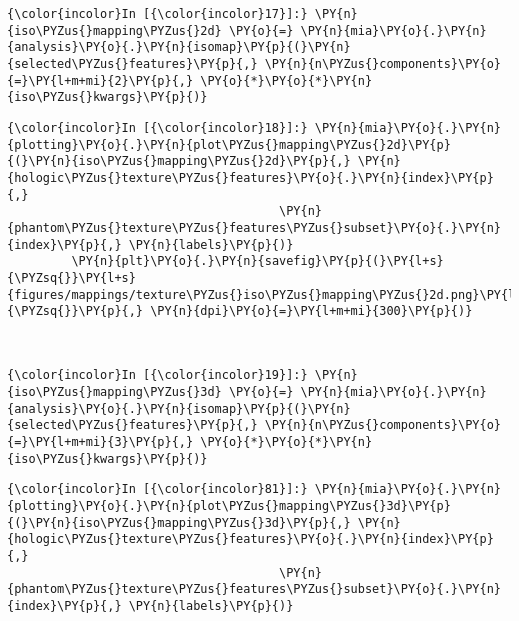     \begin{Verbatim}[commandchars=\\\{\}]
{\color{incolor}In [{\color{incolor}17}]:} \PY{n}{iso\PYZus{}mapping\PYZus{}2d} \PY{o}{=} \PY{n}{mia}\PY{o}{.}\PY{n}{analysis}\PY{o}{.}\PY{n}{isomap}\PY{p}{(}\PY{n}{selected\PYZus{}features}\PY{p}{,} \PY{n}{n\PYZus{}components}\PY{o}{=}\PY{l+m+mi}{2}\PY{p}{,} \PY{o}{*}\PY{o}{*}\PY{n}{iso\PYZus{}kwargs}\PY{p}{)}
\end{Verbatim}

    \begin{Verbatim}[commandchars=\\\{\}]
{\color{incolor}In [{\color{incolor}18}]:} \PY{n}{mia}\PY{o}{.}\PY{n}{plotting}\PY{o}{.}\PY{n}{plot\PYZus{}mapping\PYZus{}2d}\PY{p}{(}\PY{n}{iso\PYZus{}mapping\PYZus{}2d}\PY{p}{,} \PY{n}{hologic\PYZus{}texture\PYZus{}features}\PY{o}{.}\PY{n}{index}\PY{p}{,}
                                      \PY{n}{phantom\PYZus{}texture\PYZus{}features\PYZus{}subset}\PY{o}{.}\PY{n}{index}\PY{p}{,} \PY{n}{labels}\PY{p}{)}
         \PY{n}{plt}\PY{o}{.}\PY{n}{savefig}\PY{p}{(}\PY{l+s}{\PYZsq{}}\PY{l+s}{figures/mappings/texture\PYZus{}iso\PYZus{}mapping\PYZus{}2d.png}\PY{l+s}{\PYZsq{}}\PY{p}{,} \PY{n}{dpi}\PY{o}{=}\PY{l+m+mi}{300}\PY{p}{)}
\end{Verbatim}

    \begin{center}
    \end{center}
    { \hspace*{\fill} \\}

    \begin{Verbatim}[commandchars=\\\{\}]
{\color{incolor}In [{\color{incolor}19}]:} \PY{n}{iso\PYZus{}mapping\PYZus{}3d} \PY{o}{=} \PY{n}{mia}\PY{o}{.}\PY{n}{analysis}\PY{o}{.}\PY{n}{isomap}\PY{p}{(}\PY{n}{selected\PYZus{}features}\PY{p}{,} \PY{n}{n\PYZus{}components}\PY{o}{=}\PY{l+m+mi}{3}\PY{p}{,} \PY{o}{*}\PY{o}{*}\PY{n}{iso\PYZus{}kwargs}\PY{p}{)}
\end{Verbatim}

    \begin{Verbatim}[commandchars=\\\{\}]
{\color{incolor}In [{\color{incolor}81}]:} \PY{n}{mia}\PY{o}{.}\PY{n}{plotting}\PY{o}{.}\PY{n}{plot\PYZus{}mapping\PYZus{}3d}\PY{p}{(}\PY{n}{iso\PYZus{}mapping\PYZus{}3d}\PY{p}{,} \PY{n}{hologic\PYZus{}texture\PYZus{}features}\PY{o}{.}\PY{n}{index}\PY{p}{,}
                                      \PY{n}{phantom\PYZus{}texture\PYZus{}features\PYZus{}subset}\PY{o}{.}\PY{n}{index}\PY{p}{,} \PY{n}{labels}\PY{p}{)}
\end{Verbatim}

